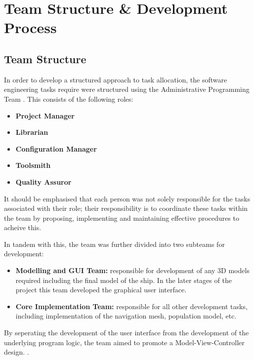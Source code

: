 %

\section{Team Structure \& Development Process}
\subsection{Team Structure}
\label{Team:subsec:structure}
In order to develop a structured approach to task allocation, the software engineering tasks require were structured using the Administrative Programming Team \cite{AdministrativeProgrammingTeam}. This consists of the following roles:
\begin{itemize}
\item{\textbf{Project Manager} }
\item{\textbf{Librarian} }
\item{\textbf{Configuration Manager} }
\item{\textbf{Toolsmith} }
\item{\textbf{Quality Assuror}}
\end{itemize}

It should be emphasised that each person was not solely responsible for the tasks associated with their role; their responsibility is to coordinate these tasks within the team by proposing, implementing and maintaining effective procedures to acheive this.

In tandem with this, the team was further divided into two subteams for development:
\begin{itemize}
\item \textbf{Modelling and GUI Team:} responsible for development of any 3D models required including the final model of the ship. In the later stages of the project this team developed the graphical user interface.
\item \textbf{Core Implementation Team:} responsible for all other development tasks, including implementation of the navigation mesh, population model, etc.
\end{itemize}

By seperating the development of the user interface from the development of the underlying program logic, the team aimed to promote a Model-View-Controller design. \cite[Ch 6.3.1]{SommervilleSoftwareEng}.
  
